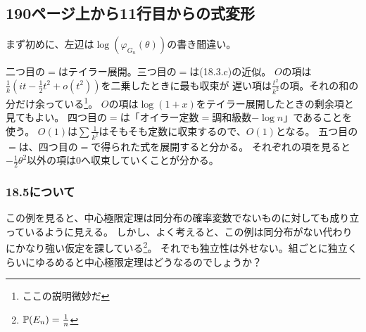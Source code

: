   \subsection{190ページ上から11行目からの式変形}
    まず初めに、左辺は$\log (\varphi_{G_n}(\theta))$の書き間違い。

    二つ目の$=$はテイラー展開。三つ目の$=$は(18.3.c)の近似。
    $O$の項は$\frac{1}{k}(it - \frac{1}{2}t^2 + o(t^2))$を二乗したときに最も収束が
    遅い項は$\frac{t^2}{k^2}$の項。それの和の分だけ余っている\footnote{ここの説明微妙だ}。
    $O$の項は$\log(1+x)$をテイラー展開したときの剰余項と見てもよい。
    四つ目の$=$は「オイラー定数$=$調和級数$- \log n$」であることを使う。
    $O(1)$は$\sum \frac{1}{k^2}$はそもそも定数に収束するので、$O(1)$となる。
    五つ目の$=$は、四つ目の$=$で得られた式を展開すると分かる。
    それぞれの項を見ると$-\frac{1}{2}\theta^2$以外の項は$0$へ収束していくことが分かる。

    \subsubsection{18.5について}
      この例を見ると、中心極限定理は同分布の確率変数でないものに対しても成り立っているように見える。
      しかし、よく考えると、この例は同分布がない代わりにかなり強い仮定を課している\footnote{${\mathbb{P}}(E_n) = \frac{1}{n}$}。
      それでも独立性は外せない。組ごとに独立くらいにゆるめると中心極限定理はどうなるのでしょうか？
